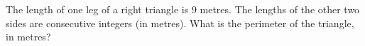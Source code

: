 The length of one leg of a right triangle is $9$ metres. The lengths of the other two sides are consecutive integers (in metres). What is the perimeter of the triangle, in metres?
